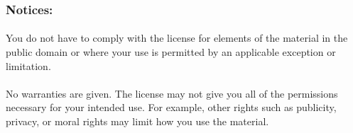 \subsubsection{ {\footnotesize Notices:}}

\paragraph{}You do not have to comply with the license for elements of the material in the public domain or where your use is permitted by an applicable exception or limitation.
\paragraph{}No warranties are given. The license may not give you all of the permissions necessary for your intended use. For example, other rights such as publicity, privacy, or moral rights may limit how you use the material.
\clearpage
\normalsize